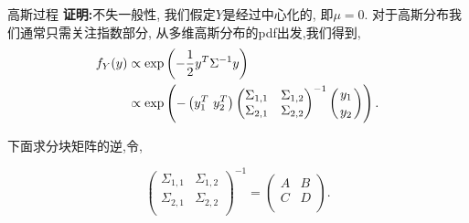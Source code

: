 \begin{frame}[fragile]{高斯过程}
    \textbf{证明:}不失一般性, 我们假定$Y$是经过中心化的, 即$\mu=0$. 对于高斯分布我们通常只需关注指数部分, 从多维高斯分布的pdf出发,我们得到,
    \begin{align}\label{A2.7}
        f_{Y}(y)&\propto\mathrm{exp}\left(-\frac{1}{2}y^{T}\Sigma^{-1}y\right) \notag \\
        &\propto\mathrm{exp}\left( -\left(y^{T}_{1}\ y^{T}_{2}\right)
        \begin{pmatrix}
            \Sigma_{1,1} & \Sigma_{1,2} \\
            \Sigma_{2,1} & \Sigma_{2,2} \\
        \end{pmatrix}^{-1}
        \left({y_{1}\atop y_{2}}\right)\right).
    \end{align}

    下面求分块矩阵的逆,令,

    \begin{equation}
        \begin{pmatrix}
            \Sigma_{1,1} & \Sigma_{1,2} \\
            \Sigma_{2,1} & \Sigma_{2,2} \\
        \end{pmatrix}^{-1}=
        \begin{pmatrix}
            A & B \\
            C & D \\
        \end{pmatrix}.
    \end{equation}
\end{frame}

